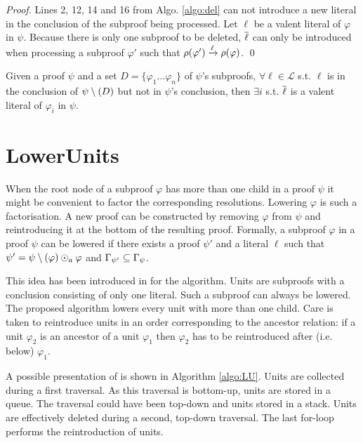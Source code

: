 \documentclass{llncs}
\begin{document}
\newcommand{\pedge}[3]{\ensuremath{\raiz{#1} \xrightarrow{#2} \raiz{#3}}}

\begin{proof}
Lines 2, 12, 14 and 16 from Algo. \ref{algo:del} can not introduce a new literal in the conclusion of
the subproof being processed. Let $\ell$ be a valent literal of $\varphi$ in $\psi$. Because
there is only one subproof to be deleted, $\overline{\ell}$ can only be introduced when processing a
subproof $\varphi'$ such that $\pedge{\varphi'}{\ell}{\varphi}$. \qed
\end{proof}

\begin{proposition}
Given a proof $\psi$ and a set $D = \{\varphi_1 \ldots \varphi_n\}$ of $\psi$'s subproofs, $\forall
\ell \in \mathcal{L}$ s.t. $\ell$ is in the conclusion of $\psi \setminus (D)$ but not in $\psi$'s
conclusion, then $\exists i$ s.t. $\overline{\ell}$ is a valent literal of $\varphi_i$ in $\psi$.
\end{proposition}


\section{LowerUnits} \label{sec:LU}

When the root node of a subproof $\varphi$ has more than one child in a proof $\psi$ it might be
convenient to factor the corresponding resolutions. Lowering $\varphi$ is such a factorisation. A
new proof can be constructed by removing $\varphi$ from $\psi$ and reintroducing it at the
bottom of the resulting proof. Formally, a subproof $\varphi$ in a proof $\psi$ can be lowered if there exists
a proof $\psi'$ and a literal $\ell$ such that $\psi' = \psi \setminus (\varphi) \odot_a \varphi$ and
$\Gamma_{\psi'} \subseteq \Gamma_{\psi}$.

This idea has been introduced in \cite{LURPI} for the {\LowerUnits} algorithm. Units are subproofs
with a conclusion consisting of only one literal. Such a subproof can always be lowered. The
proposed algorithm lowers every unit with more than one child. Care is taken to reintroduce units in
an order corresponding to the ancestor relation: if a unit $\varphi_2$ is an ancestor of a unit
$\varphi_1$ then $\varphi_2$ has to be reintroduced after (i.e. below) $\varphi_1$.

A possible presentation of {\LowerUnits} is shown in Algorithm \ref{algo:LU}. Units are collected
during a first traversal. As this traversal is bottom-up, units are stored in a queue. The traversal
could have been top-down and units stored in a stack. Units are effectively deleted during a second,
top-down traversal. The last for-loop performs the reintroduction of units.
\end{document}
